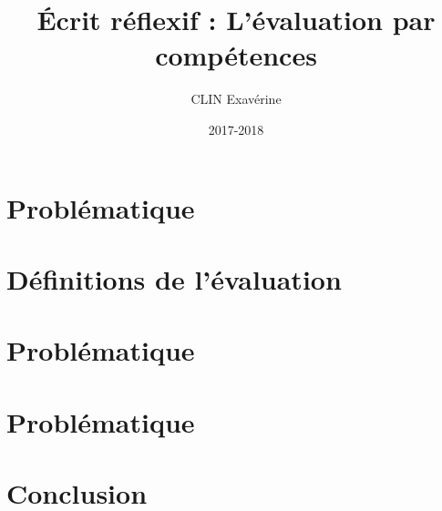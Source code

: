 \documentclass[a4paper, 12pt]{article}
\title{Écrit réflexif : L'évaluation par compétences}
\author{CLIN Exavérine}
\date{2017-2018}
\begin{document}
\maketitle
\newpage

\tableofcontents
\newpage

\part*{Problématique}


\newpage
\part*{Définitions de l'évaluation}


\newpage
\part*{Problématique}


\newpage
\part*{Problématique}


\newpage
\part*{Conclusion}


\newpage

\end{document}
